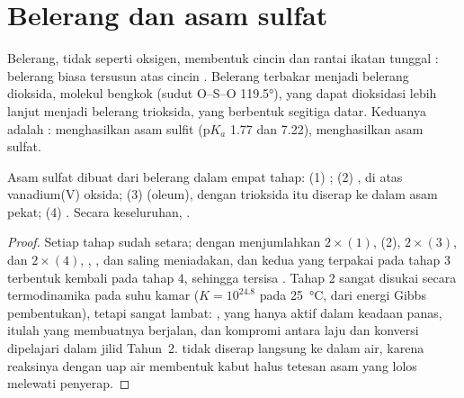 \section{Belerang dan asam sulfat}

Belerang, tidak seperti oksigen, membentuk cincin dan rantai ikatan
tunggal : belerang biasa tersusun atas cincin . Belerang
terbakar menjadi belerang dioksida, molekul bengkok (sudut O--S--O
\ang{119.5}), yang dapat dioksidasi lebih lanjut menjadi belerang
trioksida, yang berbentuk segitiga datar. Keduanya adalah :
 menghasilkan asam sulfit ($\mathrm{p}K_a$ 1.77 dan 7.22), 
menghasilkan asam sulfat.

\begin{proposition}\label{prop:b1:p-block-16-18:contact-steps}
Asam sulfat dibuat dari belerang dalam empat tahap:
(1) ; (2) , di atas 
vanadium(V) oksida; (3)  (oleum), dengan
trioksida itu diserap ke dalam asam pekat; (4) .
Secara keseluruhan, .
\end{proposition}

\begin{proof}
Setiap tahap sudah setara; dengan menjumlahkan $2\times(1)$, (2), $2\times(3)$, dan
$2\times(4)$, , , dan  saling meniadakan, dan
kedua  yang terpakai pada tahap 3 terbentuk kembali pada tahap
4, sehingga tersisa . Tahap 2 sangat disukai
secara termodinamika pada suhu kamar ($K = 10^{24.8}$ pada
\qty{25}{\celsius}, dari energi Gibbs pembentukan), tetapi sangat lambat:
, yang hanya aktif dalam keadaan panas, itulah yang membuatnya
berjalan, dan kompromi antara laju dan konversi dipelajari dalam jilid
Tahun~2.  tidak diserap langsung ke dalam air, karena reaksinya
dengan uap air membentuk kabut halus tetesan asam yang lolos melewati
penyerap.
\end{proof}

